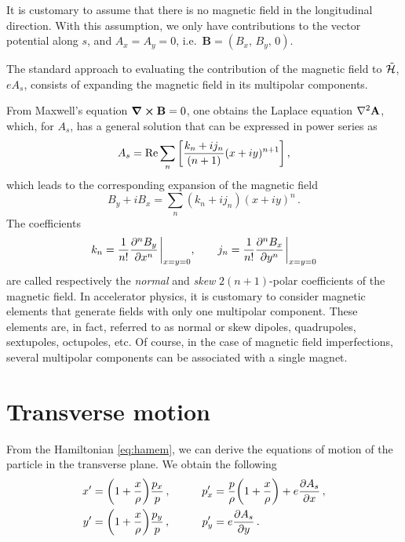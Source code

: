 It is customary to assume that there is no magnetic field in the longitudinal direction. With this assumption, we only have contributions to the vector potential along $s$, and $A_x=A_y=0$, i.e.\ $\mathbf{B}=(B_x,\,B_y,\,0)$.

The standard approach to evaluating the contribution of the magnetic field to $\tilde{\mathcal{H}}$, $eA_s$, consists of expanding the magnetic field in its multipolar components.

From Maxwell's equation $\curl\mathbf{B}=0$, one obtains the Laplace equation $\laplacian\mathbf{A}$, which, for $A_s$, has a general solution that can be expressed in power series as
%
\begin{equation}
	A_s = \Re\sum_{n}\qty[ \frac{k_n + ij_n}{(n+1)}(x+iy)^{n+1}]\, ,%
	\label{eq:as}
\end{equation}
%
which leads to the corresponding expansion of the magnetic field
\begin{equation}
	B_y + iB_x = \sum_n (k_n + ij_n) (x+iy)^n\,.
\end{equation}
%
The coefficients
\begin{equation}
	k_n = \frac{1}{n!} \pdv[n]{B_y}{x}\eval_{x=y=0}, \qquad 
	j_n = \frac{1}{n!} \pdv[n]{B_x}{y}\eval_{x=y=0} 
\end{equation}
%
are called respectively the \textit{normal} and \textit{skew} $2(n+1)$-polar coefficients of the magnetic field. In accelerator physics, it is customary to consider magnetic elements that generate fields with only one multipolar component. These elements are, in fact, referred to as normal or skew dipoles, quadrupoles, sextupoles, octupoles, etc. Of course, in the case of magnetic field imperfections, several multipolar components can be associated with a single magnet.

%
\section{Transverse motion} \label{sec:acc:transverse}
%

From the Hamiltonian \eqref{eq:hamem}, we can derive the equations of motion of the particle in the transverse plane. We obtain the following
%
\begin{equation}
    \begin{aligned}
        x' &= \qty(1+\frac{x}{\rho})\frac{p_x}{p}\,, &\qquad p_x' &= \frac{p}{\rho}\qty(1+\frac{x}{\rho}) + e\pdv{A_s}{x}\,,\\ %
        y' &= \qty(1+\frac{x}{\rho})\frac{p_y}{p}\,, &\qquad p_y' &= e\pdv{A_s}{y}\,.
    \end{aligned}
    \label{eq:ham_motion}
\end{equation}

